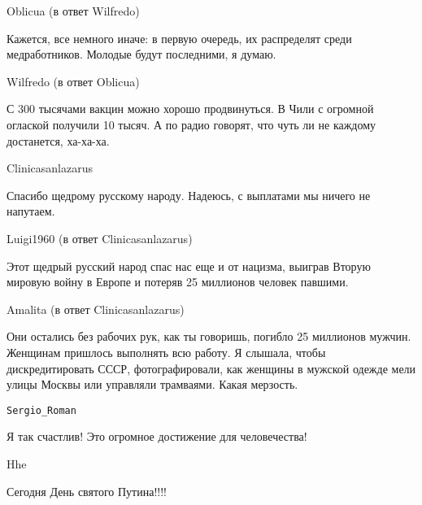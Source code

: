 Oblicua (в ответ Wilfredo)

Кажется, все немного иначе: в первую очередь, их распределят среди медработников. Молодые будут последними, я думаю.

Wilfredo (в ответ Oblicua)

С 300 тысячами вакцин можно хорошо продвинуться. В Чили с огромной оглаской
получили 10 тысяч. А по радио говорят, что чуть ли не каждому достанется,
ха-ха-ха.

Clinicasanlazarus

Спасибо щедрому русскому народу. Надеюсь, с выплатами мы ничего не напутаем.

Luigi1960 (в ответ Clinicasanlazarus)

Этот щедрый русский народ спас нас еще и от нацизма, выиграв Вторую мировую войну в Европе и потеряв 25 миллионов человек павшими.

Amalita (в ответ Clinicasanlazarus)

Они остались без рабочих рук, как ты говоришь, погибло 25 миллионов мужчин.
Женщинам пришлось выполнять всю работу. Я слышала, чтобы дискредитировать СССР,
фотографировали, как женщины в мужской одежде мели улицы Москвы или управляли
трамваями. Какая мерзость.

\verb|Sergio­_­­­Roman| 

Я так счастлив! Это огромное достижение для человечества!

Hhe

Сегодня День святого Путина!!!!
